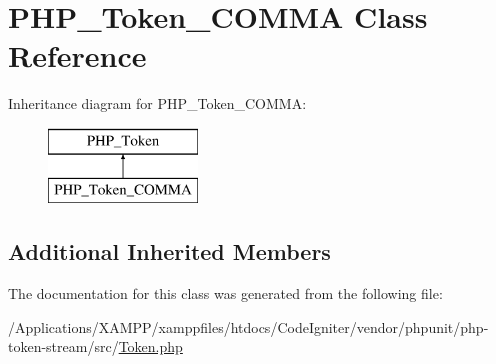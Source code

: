 \hypertarget{class_p_h_p___token___c_o_m_m_a}{}\section{P\+H\+P\+\_\+\+Token\+\_\+\+C\+O\+M\+MA Class Reference}
\label{class_p_h_p___token___c_o_m_m_a}
Inheritance diagram for P\+H\+P\+\_\+\+Token\+\_\+\+C\+O\+M\+MA\+:\begin{figure}[H]
\begin{center}
\leavevmode
\includegraphics[height=2.000000cm]{class_p_h_p___token___c_o_m_m_a}
\end{center}
\end{figure}
\subsection*{Additional Inherited Members}


The documentation for this class was generated from the following file\+:\begin{DoxyCompactItemize}
\item 
/\+Applications/\+X\+A\+M\+P\+P/xamppfiles/htdocs/\+Code\+Igniter/vendor/phpunit/php-\/token-\/stream/src/\mbox{\hyperlink{_token_8php}{Token.\+php}}\end{DoxyCompactItemize}

